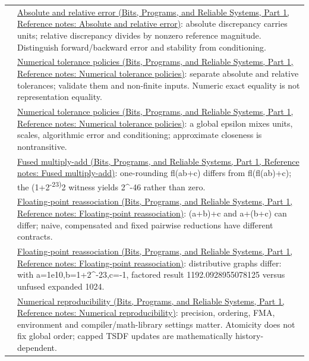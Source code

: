 {\begin{longtable}[]{@{}
  >{\raggedright\arraybackslash}p{}
  >{\raggedright\arraybackslash}p{}@{}}
82 & \href{../01-Bits-Programs-and-Reliable-Systems-P01/main.pdf\#appendix-3ae74e89b4e6}{Absolute and relative error (Bits, Programs, and Reliable Systems, Part 1, Reference notes: Absolute and relative error)}: absolute discrepancy carries units; relative discrepancy divides by nonzero reference magnitude. Distinguish forward/backward error and stability from conditioning. \\
83 & \href{../01-Bits-Programs-and-Reliable-Systems-P01/main.pdf\#appendix-0ec599f8ba27}{Numerical tolerance policies (Bits, Programs, and Reliable Systems, Part 1, Reference notes: Numerical tolerance policies)}: separate absolute and relative tolerances; validate them and non-finite inputs. Numeric exact equality is not representation equality. \\
84 & \href{../01-Bits-Programs-and-Reliable-Systems-P01/main.pdf\#appendix-0ec599f8ba27}{Numerical tolerance policies (Bits, Programs, and Reliable Systems, Part 1, Reference notes: Numerical tolerance policies)}: a global epsilon mixes units, scales, algorithmic error and conditioning; approximate closeness is nontransitive. \\
85 & \href{../01-Bits-Programs-and-Reliable-Systems-P01/main.pdf\#appendix-41e8ef22a21e}{Fused multiply-add (Bits, Programs, and Reliable Systems, Part 1, Reference notes: Fused multiply-add)}: one-rounding fl(ab+c) differs from fl(fl(ab)+c); the (1+2\textsuperscript{-23)}2 witness yields 2\^{}-46 rather than zero. \\
86 & \href{../01-Bits-Programs-and-Reliable-Systems-P01/main.pdf\#appendix-c2ac4a84c283}{Floating-point reassociation (Bits, Programs, and Reliable Systems, Part 1, Reference notes: Floating-point reassociation)}: (a+b)+c and a+(b+c) can differ; naive, compensated and fixed pairwise reductions have different contracts. \\
87 & \href{../01-Bits-Programs-and-Reliable-Systems-P01/main.pdf\#appendix-c2ac4a84c283}{Floating-point reassociation (Bits, Programs, and Reliable Systems, Part 1, Reference notes: Floating-point reassociation)}: distributive graphs differ: with a=1e10,b=1+2\^{}-23,c=-1, factored result 1192.0928955078125 versus unfused expanded 1024. \\
88 & \href{../01-Bits-Programs-and-Reliable-Systems-P01/main.pdf\#appendix-5f1a2c3f97ff}{Numerical reproducibility (Bits, Programs, and Reliable Systems, Part 1, Reference notes: Numerical reproducibility)}: precision, ordering, FMA, environment and compiler/math-library settings matter. Atomicity does not fix global order; capped TSDF updates are mathematically history-dependent. \\
\end{longtable}
}

